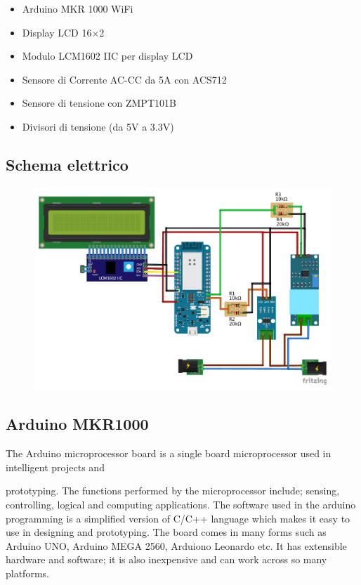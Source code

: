 \documentclass[italian,12pt,a4paper,oneside,final]{report}
\begin{document}
\begin{itemize}
\item Arduino MKR 1000 WiFi
\item Display LCD 16×2
\item Modulo LCM1602 IIC per display LCD
\item Sensore di Corrente AC-CC da 5A con ACS712
\item Sensore di tensione con ZMPT101B
\item Divisori di tensione (da 5V a 3.3V)
\end{itemize}


\subsection{Schema elettrico}
\begin{figure}[h]
\includegraphics[width=\textwidth]{power_meter_bb.pdf}
\centering
\end{figure}

\subsection{Arduino MKR1000}
The Arduino microprocessor board is a single
board microprocessor used in intelligent projects and

prototyping. The functions performed by the
microprocessor include; sensing, controlling, logical and
computing applications. The software used in the arduino
programming is a simplified version of C/C++ language
which makes it easy to use in designing and prototyping.
The board comes in many forms such as Arduino UNO,
Arduino MEGA 2560, Arduiono Leonardo etc. It has
extensible hardware and software; it is also inexpensive
and can work across so many platforms.
\end{document}
